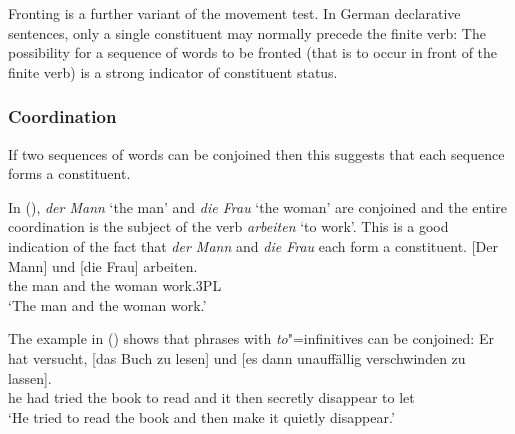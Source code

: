 {Fronting is a further variant of the movement test. In German declarative sentences, only a single constituent may normally precede the finite verb:
\eal
\label{bsp-v2}
\zl 
The possibility for a sequence of words to be fronted (that is to occur in front of the finite verb) is a strong indicator of constituent status.

\subsubsection{Coordination}

If two sequences of words can be conjoined then this suggests that each sequence
forms a constituent.

In (), \emph{der Mann} `the man' and \emph{die Frau} `the woman' are conjoined and the entire coordination
is the subject of the verb \emph{arbeiten} `to work'. This is a good indication of the fact that \emph{der Mann} and
\emph{die Frau} each form a constituent.
\ea
\gll {}[Der        Mann] und [die          Frau] arbeiten.\\
     \spacebr{}the man   and \spacebr{}the woman work.3PL\\
\glt `The man and the woman work.'
\z


The example in () shows that phrases with \emph{to}"=infinitives can be conjoined:
\ea
\gll Er hat versucht, [das Buch zu lesen] und [es dann unauffällig verschwinden zu lassen].\\
     he had tried \spacebr{}the book to read and \spacebr{}it then secretly disappear to let\\
\glt `He tried to read the book and then make it quietly disappear.'
\z
{}

}
